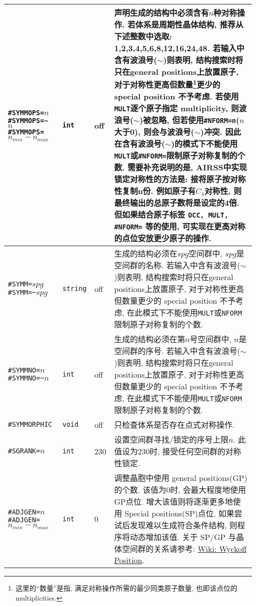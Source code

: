 \documentclass[a4paper, 10pt]{article}
\begin{document}
\begin{center}
\begin{longtable}{m{11em}|m{4em}<{\centering}|m{3em}<{\centering}|m{15em}}
\verb|#SYMMOPS=|\(n\)\hspace{6em}\verb|#SYMMOPS=~|\(n\;\;\;\;\;\;\;\;\;\;\;\)\hspace{6em}\verb|#SYMMOPS=|\(n_{min}-n_{max}\) & \verb|int| &  off & 声明生成的结构中必须含有\(n\)种对称操作. 若体系是周期性晶体结构, 推荐从下述整数中选取: 1,2,3,4,5,6,8,12,16,24,48. 若输入中含有波浪号(\(\sim\))则表明, 结构搜索时将只在general positions上放置原子, 对于对称性更高但数量\footnote{这里的``数量''是指, 满足对称操作所需的最少同类原子数量, 也即该点位的 multiplicities. }更少的 special position 不予考虑. 若使用\verb|MULT|逐个原子指定 multiplicity, 则波浪号(\(\sim\))被忽略, 但若使用\verb|#NFORM=n|(\(n\)大于0), 则会与波浪号(\(\sim\))冲突. 因此在含有波浪号(\(\sim\))的模式下不能使用\verb|MULT|或\verb|#NFORM=|限制原子对称复制的个数. \textbf{需要补充说明的是,} AIRSS中实现锁定对称性的方法是: 接将原子按对称性复制n份. 例如原子有\(C_4\)对称性, 则最终输出的总原子数将是设定的4倍. 但如果结合原子标签 \verb|OCC, MULT, #NFORM=| 等的使用, 可实现在更高对称的点位安放更少原子的操作. \\
\midrule
\verb|#SYMM=|\(spg\)\hspace{6em} \verb|#SYMM=~|\(spg\)& \verb|string| & off & 生成的结构必须在\(spg\)空间群中, \(spg\)是空间群的名称. 若输入中含有波浪号(\(\sim\))则表明, 结构搜索时将只在general positions上放置原子, 对于对称性更高但数量更少的 special position 不予考虑, 在此模式下不能使用\verb|MULT|或\verb|NFORM|限制原子对称复制的个数.\\
\midrule
\verb|#SYMMNO=|\(n\)\hspace{6em} \verb|#SYMMNO=~|\(n\) & \verb|int| & off & 生成的结构必须在第\(n\)号空间群中, \(n\)是空间群的序号. 若输入中含有波浪号(\(\sim\))则表明, 结构搜索时将只在general positions上放置原子, 对于对称性更高但数量更少的 special position 不予考虑, 在此模式下不能使用\verb|MULT|或\verb|NFORM|限制原子对称复制的个数.\\
\midrule
\verb|#SYMMORPHIC| & \verb|void| & off & 只检查体系是否存在点式对称操作.\\
\midrule
\verb|#SGRANK=|\(n\) & \verb|int| & 230 & 设置空间群寻找/锁定的序号上限\(n\). 此值设为230时, 接受任何空间群的对称性锁定.\\
\midrule
\verb|#ADJGEN=|\(n\)\hspace{4em}\verb|#ADJGEN=|\(n_{min}-n_{max}\)  & \verb|int|  & 0 & 调整晶胞中使用 general positions(GP) 的个数. 该值为0时, 会最大程度地使用GP点位. 增大该值则将逐渐更多地使用 Special positions(SP)点位. 如果尝试后发现难以生成符合条件结构, 则程序将动态增加该值. 关于 SP/GP 与晶体空间群的关系请参考: \href{https://en.wikipedia.org/wiki/Wyckoff_positions}{Wiki: Wyckoff Position}.\\

\end{longtable}
\end{center}
\end{document}
